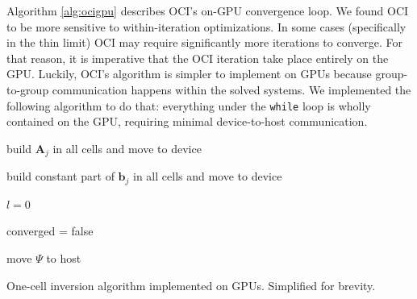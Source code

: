 Algorithm \ref{alg:ocigpu} describes OCI's on-GPU convergence loop.
We found OCI to be more sensitive to within-iteration optimizations.
In some cases (specifically in the thin limit) OCI may require significantly more iterations to converge.
For that reason, it is imperative that the OCI iteration take place entirely on the GPU.
Luckily, OCI's algorithm is simpler to implement on GPUs because group-to-group communication happens within the solved systems.
We implemented the following algorithm to do that: everything under the \texttt{while} loop is wholly contained on the GPU, requiring minimal device-to-host communication.

\begin{algorithm}
    
    build $\bm{A}_j$ in all cells and move to device 

    build constant part of $\bm{b}_j$ in all cells and move to device 

    $l = 0$ 

    converged = false

    
    move $\Psi$ to host

    \vspace{1.5em}
    
    \caption{One-cell inversion algorithm implemented on GPUs. Simplified for brevity.}
    \label{alg:ocigpu}
\end{algorithm}

